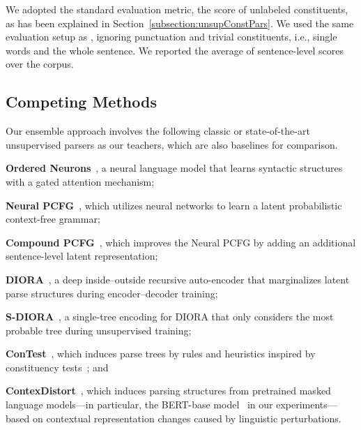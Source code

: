\documentclass{article}
\begin{document}
We adopted the standard evaluation metric, the  score of unlabeled constituents, as has been explained in Section~\ref{subsection:unsupConstPars}. We used the same evaluation setup as \citet{kim-etal-2019-compound}, ignoring punctuation and trivial constituents, i.e., single words and the whole sentence. We reported the average of sentence-level  scores over the corpus.

\subsection{Competing Methods}

Our ensemble approach involves the following classic or state-of-the-art unsupervised parsers as our teachers, which are also baselines for comparison.

\begin{compactitem}[\quad]
\item \textbf{Ordered Neurons}~\citep{shen2018ordered}, a neural language model that learns syntactic structures with a gated attention mechanism;

\item \textbf{Neural PCFG}~\citep{kim-etal-2019-compound}, which utilizes neural networks to learn a latent probabilistic context-free grammar;

\item \textbf{Compound PCFG}~\citep{kim-etal-2019-compound}, which improves the Neural PCFG by adding an additional sentence-level latent representation;

\item \textbf{DIORA}~\citep{drozdov-etal-2019-unsupervised-latent}, a deep inside--outside recursive auto-encoder that 
marginalizes latent parse structures during encoder--decoder training;

\item \textbf{S-DIORA}~\citep{drozdov2020diora}, a single-tree encoding for DIORA that only considers the most probable tree during unsupervised training;

\item \textbf{ConTest}~\citep{cao-etal-2020-unsupervised}, which induces parse trees by rules and heuristics inspired by constituency tests~\citep{mccawley1998syntactic}; and

\item \textbf{ContexDistort}~\citep{li-lu-2023-contextual}, which induces parsing structures from pretrained masked language models---in particular, the BERT-base model~\citep{devlin-etal-2019-bert} in our experiments---based on contextual representation changes caused by linguistic perturbations.
\end{compactitem}
\end{document}
